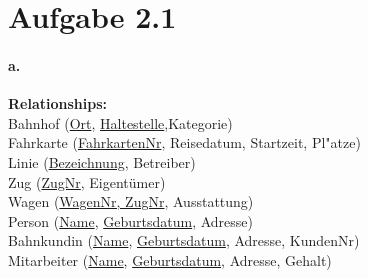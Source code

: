 \documentclass[12pt]{article}
\begin{document}
 	
 	
 	
 	
 	\section*{Aufgabe 2.1}
 	
 	
 	
 	\paragraph*{a.}
 		\textbf{Relationships:}\\
 		
	 	Bahnhof (\underline{Ort}, \underline{Haltestelle},Kategorie)\\[1.3em]
	 	
	 	Fahrkarte (\underline{FahrkartenNr}, Reisedatum, Startzeit, Pl"atze)\\[1.3em]
	 	
	 	Linie (\underline{Bezeichnung}, Betreiber)\\[1.3em]
	 	
	 	Zug (\underline{ZugNr}, Eigentümer)\\[1.3em]
	 	Wagen (\underline{WagenNr, ZugNr}, Ausstattung)\\[1.3em]
	 	
	 	Person (\underline{Name}, \underline{Geburtsdatum}, Adresse) \\[1.2em]
	 	
	 	Bahnkundin (\underline{Name}, \underline{Geburtsdatum}, Adresse, KundenNr)\\[1.2em]
	 	
	 	Mitarbeiter (\underline{Name}, \underline{Geburtsdatum},  Adresse, Gehalt)\\[1.2em]
	 	
\end{document}
